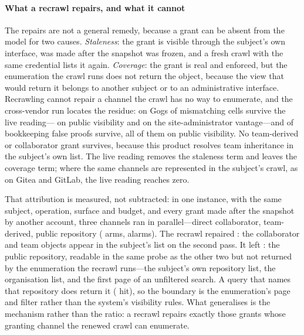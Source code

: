 



\paragraph{What a recrawl repairs, and what it cannot}
The \TmpBothFixed{} repairs are not a general remedy, because a grant can be absent from the
model for two causes. \emph{Staleness}: the grant is visible through the subject's own
interface, was made after the snapshot was frozen, and a fresh crawl with the same credential
lists it again. \emph{Coverage}: the grant is real and enforced, but the enumeration the crawl
runs does not return the object, because the view that would return it belongs to another
subject or to an administrative interface. Recrawling cannot repair a channel the crawl has no
way to enumerate, and the cross-vendor run locates the residue: on Gogs \GgMismatchLive{} of
\GgMismatchSnap{} mismatching cells survive the live reading---\GgLiveMismatchPublic{} on
public visibility and \GgLiveMismatchSiteAdmin{} on the site-administrator vantage---and
\GgFpBookkeepingLive{} of \GgFpBookkeeping{} bookkeeping false proofs survive, all
\GgLiveFpPublic{} of them on public visibility. No team-derived or collaborator grant
survives, because this product resolves team inheritance in the subject's own list. The live
reading removes the staleness term and leaves the coverage term; where the same channels are
represented in the subject's crawl, as on Gitea and GitLab, the live reading reaches zero.

That attribution is measured, not subtracted: in one instance, with the same subject,
operation, surface and budget, and every grant made after the snapshot by another account,
three channels ran in parallel---direct collaborator, team-derived, public repository
(\RfArms{} arms, \RfSnapAlarms{} alarms). The recrawl repaired \RfRepaired{}: the collaborator
and team objects appear in the subject's list on the second pass. It left \RfPersisting{}:
the public repository, readable in the same probe as the other two but not returned by the
enumeration the recrawl runs---the subject's own repository list, the organisation list, and
the first page of an unfiltered search. A query that names that repository does return it
(\RfNameFound{} hit), so the boundary is the enumeration's page and filter rather than the
system's visibility rules. What generalises is the mechanism rather than the ratio: a recrawl
repairs exactly those grants whose granting channel the renewed crawl can enumerate.

